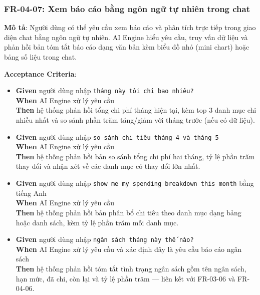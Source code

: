 \subsubsection{FR-04-07: Xem báo cáo bằng ngôn ngữ tự nhiên trong chat}

\textbf{Mô tả}: Người dùng có thể yêu cầu xem báo cáo và phân tích trực tiếp trong giao diện chat bằng ngôn ngữ tự nhiên. AI Engine hiểu yêu cầu, truy vấn dữ liệu và phản hồi bản tóm tắt báo cáo dạng văn bản kèm biểu đồ nhỏ (mini chart) hoặc bảng số liệu trong chat.



\textbf{Acceptance Criteria}:

\begin{itemize}
\item \textbf{Given} người dùng nhập \texttt{tháng này tôi chi bao nhiêu?}  \\ \hspace*{1.5em}  \textbf{When} AI Engine xử lý yêu cầu  \\ \hspace*{1.5em}  \textbf{Then} hệ thống phản hồi tổng chi phí tháng hiện tại, kèm top 3 danh mục chi nhiều nhất và so sánh phần trăm tăng/giảm với tháng trước (nếu có dữ liệu).
\item \textbf{Given} người dùng nhập \texttt{so sánh chi tiêu tháng 4 và tháng 5}  \\ \hspace*{1.5em}  \textbf{When} AI Engine xử lý yêu cầu  \\ \hspace*{1.5em}  \textbf{Then} hệ thống phản hồi bản so sánh tổng chi phí hai tháng, tỷ lệ phần trăm thay đổi và nhận xét về các danh mục có thay đổi lớn nhất.
\item \textbf{Given} người dùng nhập \texttt{show me my spending breakdown this month} bằng tiếng Anh  \\ \hspace*{1.5em}  \textbf{When} AI Engine xử lý yêu cầu  \\ \hspace*{1.5em}  \textbf{Then} hệ thống phản hồi bản phân bổ chi tiêu theo danh mục dạng bảng hoặc danh sách, kèm tỷ lệ phần trăm mỗi danh mục.
\item \textbf{Given} người dùng nhập \texttt{ngân sách tháng này thế nào?}  \\ \hspace*{1.5em}  \textbf{When} AI Engine xử lý yêu cầu và xác định đây là yêu cầu báo cáo ngân sách  \\ \hspace*{1.5em}  \textbf{Then} hệ thống phản hồi tóm tắt tình trạng ngân sách gồm tên ngân sách, hạn mức, đã chi, còn lại và tỷ lệ phần trăm — liên kết với FR-03-06 và FR-04-06.

\end{itemize}
